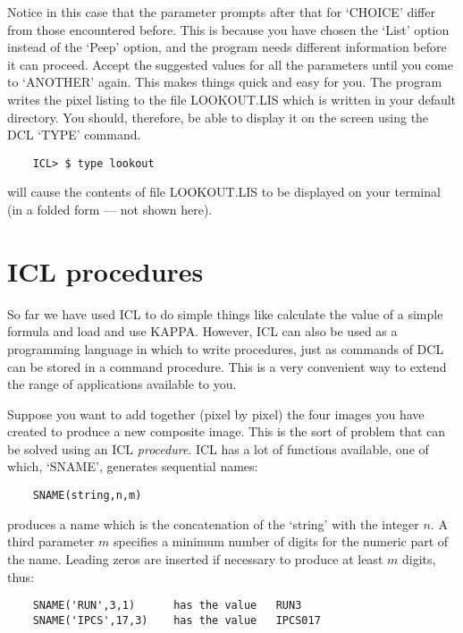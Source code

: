Notice in this case that the parameter prompts after that for `CHOICE' differ
from those encountered before.
This is because you have chosen the `List' option instead of the `Peep' option,
and the program needs different information before it can proceed.
Accept the suggested values for all the parameters until you come to `ANOTHER'
again.
This makes things quick and easy for you.
The program writes the pixel listing to the file LOOKOUT.LIS which is written
in your default directory.
You should, therefore, be able to display it on the screen using the DCL `TYPE'
command.

\begin{small}
\begin{verbatim}
    ICL> $ type lookout
\end{verbatim}
\end{small}

will cause the contents of file LOOKOUT.LIS to be displayed on your terminal
(in a folded form --- not shown here).

\section{ICL procedures}
\label{S_iclprocs}

So far we have used ICL to do simple things like calculate the value of a simple
formula and load and use KAPPA.
However, ICL can also be used as a programming language in which to write
procedures, just as commands of DCL can be stored in a command procedure.
This is a very convenient way to extend the range of applications available to
you.

Suppose you want to add together (pixel by pixel) the four images you have
created to produce a new composite image.
This is the sort of problem that can be solved using an ICL {\em procedure}.
ICL has a lot of functions available, one of which, `SNAME', generates
sequential names:

\begin{small}
\begin{verbatim}
    SNAME(string,n,m)
\end{verbatim}
\end{small}

produces a name which is the concatenation of the `string' with the
integer $n$.
A third parameter $m$ specifies a minimum number of digits for the
numeric part of the name. Leading zeros are inserted if necessary to produce at
least $m$ digits, thus:

\begin{small}
\begin{verbatim}
    SNAME('RUN',3,1)      has the value   RUN3
    SNAME('IPCS',17,3)    has the value   IPCS017
\end{verbatim}
\end{small}

